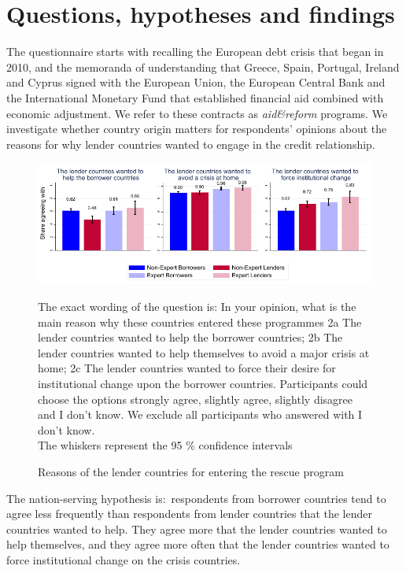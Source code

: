 
\section{Questions, hypotheses and findings}

The questionnaire starts with recalling the European debt
crisis that began in 2010, and the memoranda of understanding
that Greece, Spain, Portugal, Ireland and Cyprus signed with the European
Union, the European Central Bank and the International Monetary Fund that  
established financial aid combined with economic adjustment. We refer to
these contracts as \textit{aid\&reform} programs. 
We investigate whether country
origin matters for respondents' opinions about the reasons for why lender countries wanted to engage in the credit relationship. 
\begin{figure}[h!]
\caption{Reasons of the lender countries for entering the rescue program}
    \begin{center}
    \includegraphics[scale=1.2]{graph2.pdf}
    \label{fig:Figure1}
    \end{center}
     \tiny
     \begin{tablenotes} 
    {The exact wording of the question is: In your opinion, what is the main reason why these countries entered these programmes 2a The lender countries wanted to help the borrower countries; 2b The lender countries wanted to help themselves to avoid a major crisis at home; 2c The lender countries wanted to force their desire for institutional change upon the borrower countries. Participants could choose the options strongly agree, slightly agree, slightly disagree and I don't know. We exclude all participants who answered with I don't know.\\
    The whiskers represent the 95 \% confidence intervals}
    \end{tablenotes}
\end{figure}

The nation-serving hypothesis is:\ respondents from borrower countries tend
to agree less frequently than respondents from lender countries 
that the lender countries wanted to help. They agree more that
the lender countries wanted to help themselves, and they agree more 
often that the lender countries wanted to force institutional change on the
crisis countries.\textit{\ }

